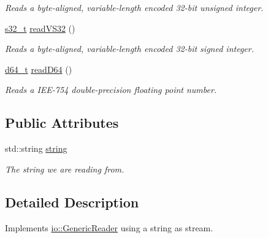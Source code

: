 \begin{DoxyCompactItemize}
\begin{DoxyCompactList}\small\item\em Reads a byte-\/aligned, variable-\/length encoded 32-\/bit unsigned integer. \end{DoxyCompactList}\item 
\hypertarget{classjswf_1_1io_1_1_string_reader_a4d73ed16cfc8382c29e7879b6c449cc8}{\hyperlink{namespacejswf_a19b2a5980fe3b05994a2127a3c7e0521}{s32\+\_\+t} \hyperlink{classjswf_1_1io_1_1_string_reader_a4d73ed16cfc8382c29e7879b6c449cc8}{read\+V\+S32} ()}\label{classjswf_1_1io_1_1_string_reader_a4d73ed16cfc8382c29e7879b6c449cc8}

\begin{DoxyCompactList}\small\item\em Reads a byte-\/aligned, variable-\/length encoded 32-\/bit signed integer. \end{DoxyCompactList}\item 
\hypertarget{classjswf_1_1io_1_1_string_reader_a9d9df157b37598bd0ace7100245e359a}{\hyperlink{namespacejswf_acfbb3c7c9fbb807e233387995eb76a96}{d64\+\_\+t} \hyperlink{classjswf_1_1io_1_1_string_reader_a9d9df157b37598bd0ace7100245e359a}{read\+D64} ()}\label{classjswf_1_1io_1_1_string_reader_a9d9df157b37598bd0ace7100245e359a}

\begin{DoxyCompactList}\small\item\em Reads a I\+E\+E-\/754 double-\/precision floating point number. \end{DoxyCompactList}\end{DoxyCompactItemize}
\subsection*{Public Attributes}
\begin{DoxyCompactItemize}
\item 
\hypertarget{classjswf_1_1io_1_1_string_reader_a6671e2e8098cd1b6a64a3c562d9824a4}{std\+::string \hyperlink{classjswf_1_1io_1_1_string_reader_a6671e2e8098cd1b6a64a3c562d9824a4}{string}}\label{classjswf_1_1io_1_1_string_reader_a6671e2e8098cd1b6a64a3c562d9824a4}

\begin{DoxyCompactList}\small\item\em The string we are reading from. \end{DoxyCompactList}\end{DoxyCompactItemize}


\subsection{Detailed Description}
Implements \hyperlink{classjswf_1_1io_1_1_generic_reader}{io\+::\+Generic\+Reader} using a string as stream. 

